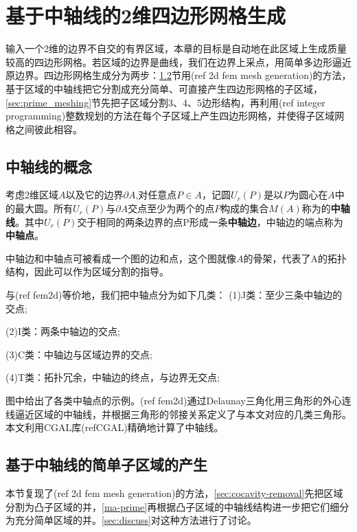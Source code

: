 \chapter{基于中轴线的2维四边形网格生成}\label{chap:maquad}
输入一个2维的边界不自交的有界区域，本章的目标是自动地在此区域上生成质量较高的四边形网格。若区域的边界是曲线，我们在边界上采点，用简单多边形逼近原边界。四边形网格生成分为两步：\ref{sec:ma_subdivion}节用(ref 2d fem mesh generation)的方法，基于区域的中轴线把它分割成充分简单、可直接产生四边形网格的子区域，\ref{sec:prime_meshing}节先把子区域分割3、4、5边形结构，再利用(ref integer programming)整数规划的方法在每个子区域上产生四边形网格，并使得子区域网格之间彼此相容。
\section{中轴线的概念}\label{sec:ma}
\begin{definition}\label{def:ma}
考虑2维区域$A$以及它的边界$\partial A$,对任意点$P\in A$，记圆$U_r(P)$是以$P$为圆心在$A$中的最大圆。所有$U_r(P)$与$\partial A$交点至少为两个的点$P$构成的集合$M(A)$称为的\textbf{中轴线}。其中$U_r(P)$交于相同的两条边界的点P形成一条\textbf{中轴边}，中轴边的端点称为\textbf{中轴点}。
\end{definition}
中轴边和中轴点可被看成一个图的边和点，这个图就像$A$的骨架，代表了A的拓扑结构，因此可以作为区域分割的指导。
\begin{definition} \label{medial-vertex}
与(ref fem2d)等价地，我们把中轴点分为如下几类：%
	(1)J类：至少三条中轴边的交点;
	
	(2)I类：两条中轴边的交点;
	
	(3)C类：中轴边与区域边界的交点;
	
	(4)T类：拓扑冗余，中轴边的终点，与边界无交点;
\end{definition}
图中给出了各类中轴点的示例。(ref fem2d)通过Delaunay三角化用三角形的外心连线逼近区域的中轴线，并根据三角形的邻接关系定义了与本文对应的几类三角形。本文利用CGAL库(refCGAL)精确地计算了中轴线。 
\section{基于中轴线的简单子区域的产生}\label{sec:ma_subdivion}
本节复现了(ref 2d fem mesh generation)的方法，\ref{sec:cocavity-removal}先把区域分割为凸子区域的并，\ref{ma-prime}再根据凸子区域的中轴线结构进一步把它们细分为充分简单区域的并。\ref{sec:discuss}对这种方法进行了讨论。
